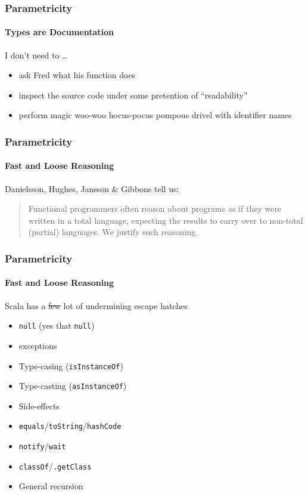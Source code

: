 \begin{frame}[fragile]
\frametitle{Parametricity}
\framesubtitle{Types are Documentation}
\begin{block}{I don't need to \ldots}
\begin{itemize}
  \item<1> ask Fred what his function does
  \item<2> inspect the source code under some pretention of ``readability''
  \item<3> perform magic woo-woo hocus-pocus pompous drivel with identifier names
\end{itemize}
\end{block}
\end{frame}


\begin{frame}
\frametitle{Parametricity}
\framesubtitle{Fast and Loose Reasoning}
\begin{block}{Danielsson, Hughes, Jansson \& Gibbons \cite{danielsson2006fast} tell us:}
\begin{quotation}
Functional programmers often reason about programs as if
they were written in a total language, expecting the results
to carry over to non-total (partial) languages. We justify
such reasoning.
\end{quotation}
\end{block}
\end{frame}


\begin{frame}
\frametitle{Parametricity}
\framesubtitle{Fast and Loose Reasoning}
\begin{block}{Scala has a \sout{few} lot of undermining escape hatches}
\begin{itemize}
  \item<2-> \lstinline{null} \tiny{(yes that \lstinline{null})\normalsize}
  \item<3-> exceptions
  \item<4-> Type-casing (\lstinline{isInstanceOf})
  \item<5-> Type-casting (\lstinline{asInstanceOf})
  \item<6-> Side-effects
  \item<7-> \lstinline{equals}/\lstinline{toString}/\lstinline{hashCode}
  \item<8-> \lstinline{notify}/\lstinline{wait}
  \item<9-> \lstinline{classOf}/\lstinline{.getClass}
  \item<10-> General recursion
\end{itemize}
\end{block}
\end{frame}



